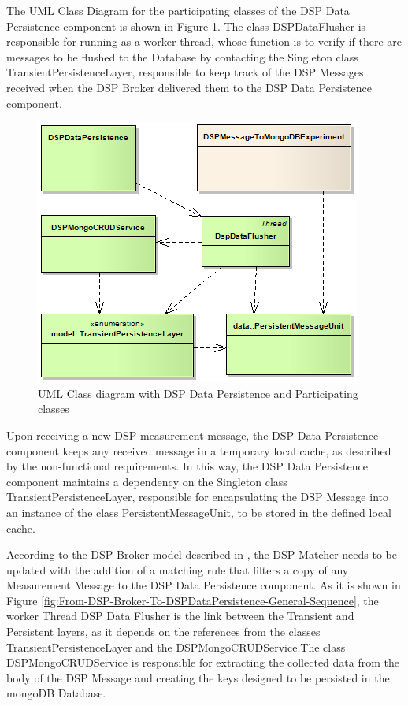 The UML Class Diagram for the participating classes of the DSP Data
Persistence component is shown in Figure
\ref{fig:DSP-DataPersistence-Flusher-Classes}. The class DSPDataFlusher is
responsible for running as a worker thread, whose function is to verify if
there are messages to be flushed to the Database by contacting the Singleton
class \cite{gof} TransientPersistenceLayer, responsible to keep track of the
DSP Messages received when the DSP Broker delivered them to the DSP Data
Persistence component.

\begin{figure}[!h]
  \centering
  \includegraphics[scale=0.65]{../diagrams/DSP-DataPersistence-Flusher-Classes}
  \caption{UML Class diagram with DSP Data Persistence and Participating classes}
  \label{fig:DSP-DataPersistence-Flusher-Classes}
\end{figure}

Upon receiving a new DSP measurement message, the DSP Data Persistence
component keeps any received message in a temporary local cache, as described 
by the non-functional requirements. In this way, the DSP Data Persistence 
component maintains a dependency on the Singleton class TransientPersistenceLayer, 
responsible for encapsulating the DSP Message into an instance of the class 
PersistentMessageUnit, to be stored in the defined local cache.

According to the DSP Broker model described in \cite{netbeams-dsp-architecture}, 
the DSP Matcher needs to be updated with the addition of a matching rule that
filters a copy of any Measurement Message to the DSP Data Persistence component. 
As it is shown in Figure
\ref{fig:From-DSP-Broker-To-DSPDataPersistence-General-Sequence}, the worker
Thread DSP Data Flusher is the link between the Transient and Persistent
layers, as it depends on the references from the classes
TransientPersistenceLayer and the DSPMongoCRUDService.The class
DSPMongoCRUDService is responsible for extracting the collected data from the
body of the DSP Message and creating the keys designed to be persisted
in the mongoDB Database.

